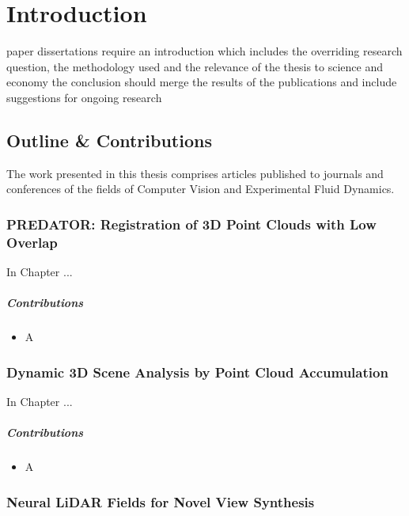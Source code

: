 \chapter{Introduction} 
paper dissertations require an introduction which includes the overriding research question, the methodology used and the relevance of the thesis to science and economy
the conclusion should merge the results of the publications and include suggestions for ongoing research


\section{Outline \& Contributions} 

The work presented in this thesis comprises articles published to journals and conferences of the fields of Computer Vision and Experimental Fluid Dynamics.


\subsection{PREDATOR: Registration of 3D Point Clouds with Low Overlap}

In Chapter ...

\paragraph{Contributions}
\begin{itemize}
\item A
\end{itemize}

\subsection{Dynamic 3D Scene Analysis by Point Cloud Accumulation}

In Chapter ...

\paragraph{Contributions}
\begin{itemize}
\item A
\end{itemize}

\subsection{Neural LiDAR Fields for Novel View Synthesis}

